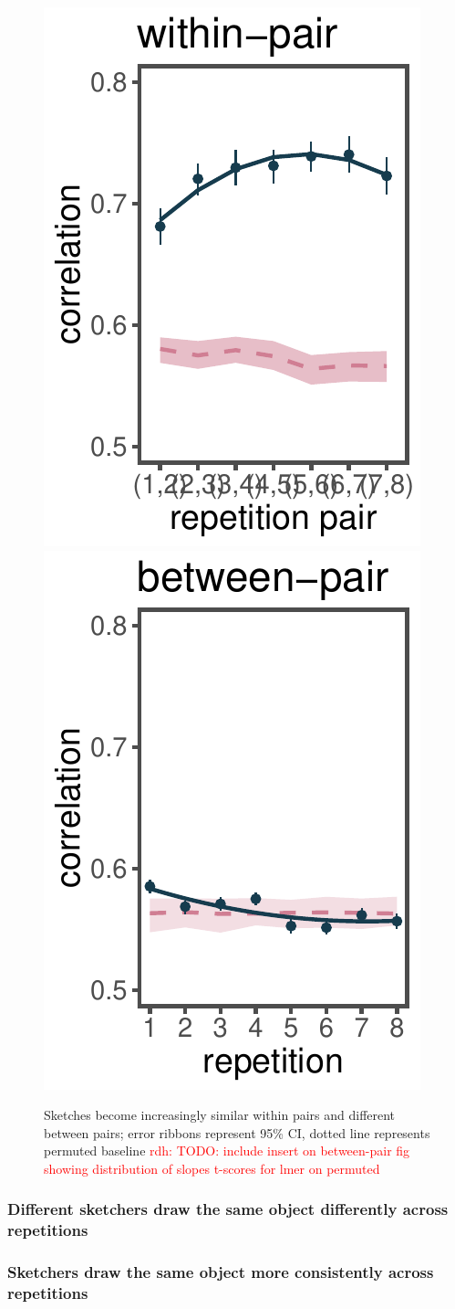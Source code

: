 \documentclass[10pt,letterpaper]{article}
\newcommand{\rdh}[1]{\textcolor{Red}{rdh: #1}}
\begin{document}
\begin{figure}
\includegraphics[width=0.45\linewidth]{figures/within.pdf}
\includegraphics[width=0.45\linewidth]{figures/across.pdf}
\caption{Sketches become increasingly similar within pairs and different between pairs; error ribbons represent 95\% CI, dotted line represents permuted baseline \rdh{TODO: include insert on between-pair fig showing distribution of slopes t-scores for lmer on permuted}} \label{within-across}
\end{figure}

\subsubsection{Different sketchers draw the same object differently across repetitions} 

\subsubsection{Sketchers draw the same object more consistently across repetitions}
\end{document}
